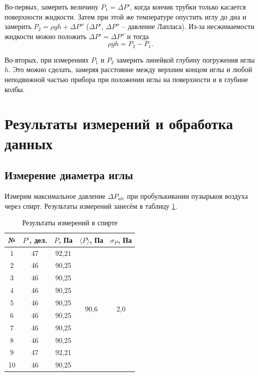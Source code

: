 \documentclass[a4paper, 12pt]{article}
\begin{document}
    \noindent Во-первых, замерить величину $P_1= \Delta P'$, когда кончик трубки только касается поверхности жидкости. Затем при этой же температуре опустить иглу до дна и замерить $P_2= \rho gh + \Delta P''$ ($\Delta P'$, $\Delta P''$ -- давление Лапласа). Из-за  несжимаемости  жидкости можно положить $\Delta P' = \Delta P''$ и тогда \[ \rho gh= P_2 - P_1. \]
 
    \noindent Во-вторых, при измерениях $P_1$ и $P_2$ замерить линейкой  глубину погружения иглы $h$. Это можно сделать, замеряя расстояние между верхним концом иглы и любой неподвижной частью прибора при положении иглы на поверхности и в глубине колбы.    

    \section*{Результаты измерений и обработка данных}

    \subsection*{Измерение диаметра иглы}

    \noindent Измерим максимальное давление $\Delta P_{alc}$  при  пробулькивании пузырьков воздуха через спирт. Результаты измерений занесём в таблицу \ref{tab:alcohol}.

    \begin{table}[H]
	\centering
	\begin{tabular}{|c|c|c|c|c|}
		\hline
            № & $ P' $, дел. &  $ P $, Па  & $ \langle P \rangle $, Па   & $ \sigma_{P} $, Па \\ \hline
            1 & 47 & 92,21 & \multirow{10}{*}{90,6} & \multirow{10}{*}{2,0} \\ \cline{1-3}
            2  & 46 & 90,25 & & \\ \cline{1-3}
            3  & 46 & 90,25 & & \\ \cline{1-3}
            4  & 46 & 90,25 & & \\ \cline{1-3}
            5  & 46 & 90,25 & & \\ \cline{1-3}
            6  & 46 & 90,25 & & \\ \cline{1-3}
            7  & 46 & 90,25 & & \\ \cline{1-3}
            8  & 46 & 90,25 & & \\ \cline{1-3}
            9  & 47 & 92,21 & & \\ \cline{1-3}
            10 & 46 & 90,25 & & \\ \hline
	\end{tabular}
	\caption{Результаты измерений в спирте}
	\label{tab:alcohol}
    \end{table}
\end{document}
